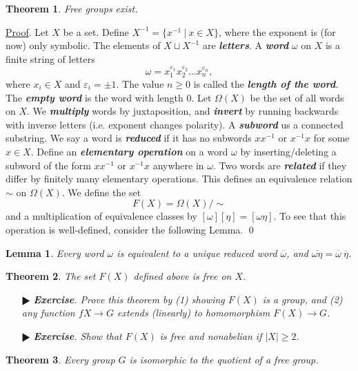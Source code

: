 \documentclass[11pt]{amsart}
\newtheorem*{theorem*}{Theorem}
\newtheorem*{lemma*}{Lemma}
\theoremstyle{definition}
\renewenvironment{proof}{\underline{Proof}.}{\qed}
\renewcommand\geq{\geqslant}
\renewcommand\:{\colon}
\newcommand{\1}{\mathds{1}}
\newcommand{\exc}[1]{\vspace{-2.5pt}\begin{itemize}[leftmargin=15pt]\item[$\RHD$] \textit{\textbf{Exercise}. #1}\end{itemize}}
\begin{document}
\begin{theorem*}
	Free groups exist.
\end{theorem*}
\begin{proof}
	Let $X$ be a set. Define $X^{-1} = \{x^{-1} \ | \ x \in X\}$, where the exponent is (for now) only symbolic. The elements of $X \sqcup X^{-1}$ are \textbf{\textit{letters}}. A \textbf{\textit{word}} $\omega$ on $X$ is a finite string of letters
		\[ \omega = x_1^{\varepsilon_1}x_2^{\varepsilon_2} \dots x_n^{\varepsilon_n}, \]
	where $x_i \in X$ and $\varepsilon_i = \pm 1$. The value $n \geq 0$ is called the \textbf{\textit{length of the word}}. The \textbf{\textit{empty word}} is the word with length 0. Let $\Omega(X)$ be the set of all words on $X$. We \textbf{\textit{multiply}} words by juxtaposition, and \textbf{\textit{invert}} by running backwards with inverse letters (i.e. exponent changes polarity). A \textbf{\textit{subword}} us a connected substring. We say a word is \textbf{\textit{reduced}} if it has no subwords $xx^{-1}$ or $x^{-1}x$ for some $x \in X$. Define an \textbf{\textit{elementary operation}} on a word $\omega$ by inserting/deleting a subword of the form $xx^{-1}$ or $x^{-1}x$ anywhere in $\omega$. Two words are \textbf{\textit{related}} if they differ by finitely many elementary operations. This defines an equivalence relation $\sim$ on $\Omega(X)$. We define the set 
		\[ F(X) = \Omega(X)/\sim \] 
	and a multiplication of equivalence classes by $[\omega][\eta] = [\omega\eta]$. To see that this operation is well-defined, consider the following Lemma.
\end{proof}

\begin{lemma*}
	Every word $\omega$ is equivalent to a unique reduced word $\overline{\omega}$, and $\overline{\omega\eta} = \overline{\omega} \ \overline{\eta}$.
\end{lemma*}

\begin{theorem*}
	The set $F(X)$ defined above is free on $X$.
\end{theorem*}

\exc{Prove this theorem by (1) showing $F(X)$ is a group, and (2) any function $fX \to G$ extends (linearly) to homomorphism $F(X) \to G$.}
\exc{Show that $F(X)$ is free and nonabelian if $|X| \geq 2$.}

\begin{theorem*}
	Every group $G$ is isomorphic to the quotient of a free group.
\end{theorem*}
\end{document}
